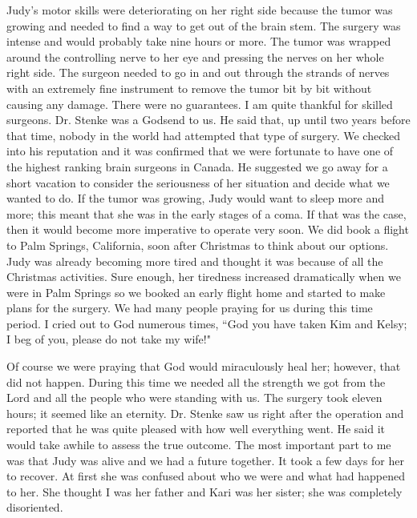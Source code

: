 \documentclass[oneside]{book}
\begin{document}
Judy's motor skills were deteriorating on her right side because the tumor was growing and needed to find a way to get out of the brain stem. The surgery was intense and would probably take nine hours or more. The tumor was wrapped around the controlling nerve to her eye and pressing the nerves on her whole right side. The surgeon needed to go in and out through the strands of nerves with an extremely fine instrument to remove the tumor bit by bit without causing any damage. There were no guarantees. I am quite thankful for skilled surgeons. Dr. Stenke was a Godsend to us. He said that, up until two years before that time, nobody in the world had attempted that type of surgery. We checked into his reputation and it was confirmed that we were fortunate to have one of the highest ranking brain surgeons in Canada. He suggested we go away for a short vacation to consider the seriousness of her situation and decide what we wanted to do. If the tumor was growing, Judy would want to sleep more and more; this meant that she was in the early stages of a coma. If that was the case, then it would become more imperative to operate very soon. We did book a flight to Palm Springs, California, soon after Christmas to think about our options. Judy was already becoming more tired and thought it was because of all the Christmas activities. Sure enough, her tiredness increased dramatically when we were in Palm Springs so we booked an early flight home and started to make plans for the surgery. We had many people praying for us during this time period. I cried out to God numerous times, ``God you have taken Kim and Kelsy; I beg of you, please do not take my wife!"

Of course we were praying that God would miraculously heal her; however, that did not happen. During this time we needed all the strength we got from the Lord and all the people who were standing with us. The surgery took eleven hours; it seemed like an eternity. Dr. Stenke saw us right after the operation and reported that he was quite pleased with how well everything went. He said it would take awhile to assess the true outcome. The most important part to me was that Judy was alive and we had a future together. It took a few days for her to recover. At first she was confused about who we were and what had happened to her. She thought I was her father and Kari was her sister; she was completely disoriented. 
\end{document}
